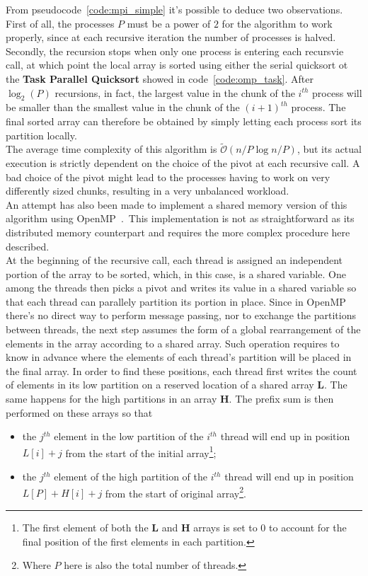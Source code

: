 \documentclass[../main.tex]{subfiles}
\begin{document}
From pseudocode~\ref{code:mpi_simple} it's possible to deduce two observations. First of all, the processes $P$ must be a power of $2$ for the algorithm to work properly, since at each recursive iteration the number of processes is halved. Secondly, the recursion stops when only one process is entering each recursvie call, at which point the local array is sorted using either the serial quicksort ot the \textbf{Task Parallel Quicksort} showed in code~\ref{code:omp_task}. After $\log_2(P)$ recursions, in fact, the largest value in the chunk of the $i^{th}$ process will be smaller than the smallest value in the chunk of the ${ (i+1) }^{th}$ process. The final sorted array can therefore be obtained by simply letting each process sort its partition locally.\\
The average time complexity of this algorithm is $\tilde{\mathcal{O}}(n/P \log n/P)$, but its actual execution is strictly dependent on the choice of the pivot at each recursive call. A bad choice of the pivot might lead to the processes having to work on very differently sized chunks, resulting in a very unbalanced workload.\\
An attempt has also been made to implement a shared memory version of this algorithm using OpenMP~\cite{openmp}.\ This implementation is not as straightforward as its distributed memory counterpart and requires the more complex procedure here described.\\
At the beginning of the recursive call, each thread is assigned an independent portion of the array to be sorted, which, in this case, is a shared variable. One among the threads then picks a pivot and writes its value in a shared variable so that each thread can parallely partition its portion in place. Since in OpenMP there's no direct way to perform message passing, nor to exchange the partitions between threads, the next step assumes the form of a global rearrangement of the elements in the array according to a shared  array. Such operation requires to know in advance where the elements of each thread's partition will be placed in the final array. In order to find these positions, each thread first writes the count of elements in its low partition on a reserved location of a shared array $\mathbf{L}$. The same happens for the high partitions in an array $\mathbf{H}$. The prefix sum is then performed on these arrays so that

\begin{itemize}
    \item the $j^{th}$ element in the low partition of the $i^{th}$ thread will end up in position \\$L[i] + j$ from the start of the initial array\footnote{The first element of both the $\mathbf{L}$ and $\mathbf{H}$ arrays is set to $0$ to account for the final position of the first elements in each partition.};
    \item the $j^{th}$ element of the high partition of the $i^{th}$ thread will end up in position \\$L[P] + H[i] + j$ from the start of original array\footnote{Where $P$ here is also the total number of threads.}.
\end{itemize}
\end{document}
